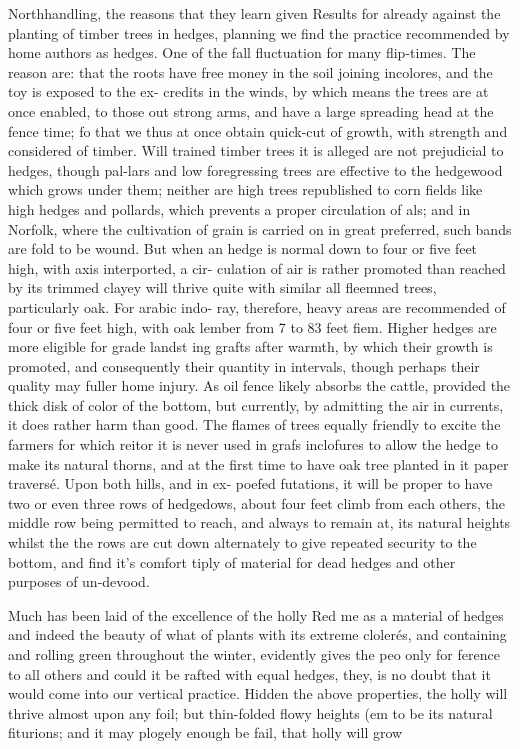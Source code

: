 \documentclass{article}
\begin{document}
Northhandling, the reasons that they learn given Results for already against the planting of timber trees in hedges, planning we find the practice recommended by home authors as hedges. One of the fall fluctuation for many flip-times. The reason are: that the roots have free money in the soil joining incolores, and the toy is exposed to the ex- credits in the winds, by which means the trees are at once enabled, to those out strong arms, and have a large spreading head at the fence time; fo that we thus at once obtain quick-cut of growth, with strength and considered of timber. Will trained timber trees it is alleged are not prejudicial to hedges, though pal-lars and low foregressing trees are effective to the hedgewood which grows under them; neither are high trees republished to corn fields like high hedges and pollards, which prevents a proper circulation of als; and in Norfolk, where the cultivation of grain is carried on in great preferred, such bands are fold to be wound. But when an hedge is normal down to four or five feet high, with axis interported, a cir- culation of air is rather promoted than reached by its trimmed clayey will thrive quite with similar all fleemned trees, particularly oak. For arabic indo- ray, therefore, heavy areas are recommended of four or five feet high, with oak lember from 7 to 83 feet fiem. Higher hedges are more eligible for grade landst ing grafts after warmth, by which their growth is promoted, and consequently their quantity in intervals, though perhaps their quality may fuller home injury. As oil fence likely absorbs the cattle, provided the thick disk of color of the bottom, but currently, by admitting the air in currents, it does rather harm than good. The flames of trees equally friendly to excite the farmers for which reitor it is never used in grafs inclofures to allow the hedge to make its natural thorns, and at the first time to have oak tree planted in it paper traversé. Upon both hills, and in ex- poefed futations, it will be proper to have two or even three rows of hedgedows, about four feet climb from each others, the middle row being permitted to reach, and always to remain at, its natural heights whilst the the rows are cut down alternately to give repeated security to the bottom, and find it's comfort tiply of material for dead hedges and other purposes of un-devood.

Much has been laid of the excellence of the holly Red me as a material of hedges and indeed the beauty of what of plants with its extreme clolerés, and containing and rolling green throughout the winter, evidently gives the peo only for ference to all others and could it be rafted with equal hedges, they, is no doubt that it would come into our vertical practice. Hidden the above properties, the holly will thrive almost upon any foil; but thin-folded flowy heights (em to be its natural fiturions; and it may plogely enough be fail, that holly will grow
\end{document}
